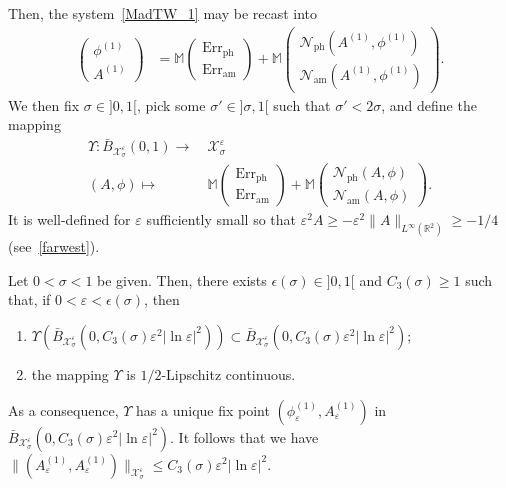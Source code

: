 \documentclass[AHL,Unicode,longabstracts,published]{cedram}
\newcommand*\R{\mathbb R}
\newcommand{\bbM}{\mathbb{M}}
\newcommand{\amm}{\mathrm{am}}
\newcommand{\phl}{\mathrm{ph}}
\newcommand{\Err}{\mathrm{Err}}
\newcommand*\BN{\mathcal{N}}
\newcommand*\BX{\mathcal{X}}
\newcommand*\ii{\infty}
\newcommand*\gs{\geqslant }
\newcommand*\ls{\leqslant }
\newcommand*\e{\varepsilon}
\newcommand*\ep{\epsilon}
\newcommand*\lne{\lvert \ln \varepsilon \rvert}
\newcommand*\s{\sigma}
\newcommand*{\romanenumi}{\renewcommand*{\theenumi}{\roman{enumi}}}
\begin{document}
Then, the system~\eqref{MadTW_1} may be recast into
\begin{align}\label{patafix}
\begin{pmatrix}
\phi^{(1)} \\ A^{(1)}
\end{pmatrix}
& = \bbM
\begin{pmatrix}
{\Err}_{\phl} \\ {\Err}_{\amm}
\end{pmatrix}
+ \bbM
\begin{pmatrix}
\BN_{{\phl}} \left(A^{(1)}, \phi^{(1)}\right) \\ \BN_{{\amm} } \left(A^{(1)}, \phi^{(1)}\right)
\end{pmatrix}.
\end{align}
We then fix $ \s \in]0,1 [$, pick some $ \s' \in] \s, 1 [$ such that $ \s' < 2\s $, and define the mapping
\begin{align*}
\Upsilon : \bar{B}_{ \BX^\e_{\s} } (0, 1) \to & \ \BX^\e_{\s }
\\ (A, \phi) \mapsto & \
\bbM
\begin{pmatrix}
{\Err}_{\phl} \\ {\Err}_{\amm}
\end{pmatrix}
+ \bbM
\begin{pmatrix}
\BN_{{\phl} } (A, \phi) \\ \BN_{{\amm} } (A, \phi)
\end{pmatrix}.
\end{align*}
It is well-defined for $\e $ sufficiently small so that $ \e^2 A \gs - \e^2 \| A \|_{L^\ii(\R^2)}
\gs -1/4 $ (see~\eqref{farwest}).


\begin{prop}\label{contraction}
Let $ 0 < \s < 1 $ be given. Then, there exists $ \ep (\s) \in]0,1[$ and $ C_3 (\s) \gs 1 $ such that, if $ 0 < \e < \ep(\s) $, then
\begin{enumerate}\romanenumi
\item\label{prop2.11.1} $ \Upsilon (\bar{B}_{ \BX^\e_{\s} } (0, C_3 (\s) \e^2 \lne^2) )
\subset \bar{B}_{ \BX^\e_{\s} } (0, C_3 (\s) \e^2 \lne^2 ) $;

\item\label{prop2.11.2} the mapping $ \Upsilon $ is $1/2$-Lipschitz continuous.
\end{enumerate}
As a consequence, $\Upsilon $ has a unique fix point $ (\phi^{(1)}_\e, A^{(1)}_\e) $ in $ \bar{B}_{ \BX^\e_{\s} } (0, C_3 (\s) \e^2 \lne^2) $. It follows that we have $ \| (A^{(1)}_\e, A^{(1)}_\e) \|_{ \BX^\e_{\s} } \ls C_3 (\s) \e^2 \lne^2 $.
\end{prop}
\end{document}
